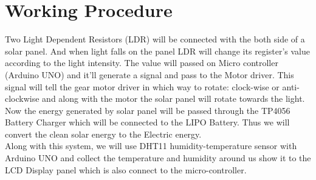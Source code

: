 \section*{Working Procedure}
Two Light Dependent Resistors (LDR) will be connected with the both side of a solar panel. And when light falls on the panel LDR will change its register's value according to the light intensity. The value will passed on Micro controller (Arduino UNO) and it'll generate a signal and pass to the Motor driver. This signal will tell the gear motor driver in which way to rotate: clock-wise or anti-clockwise and along with the motor the solar panel will rotate towards the light.\\

Now the energy generated by solar panel will be passed through the TP4056 Battery Charger which will be connected to the LIPO Battery. Thus we will convert the clean solar energy to the Electric energy.\\
Along with this system, we will use DHT11 humidity-temperature sensor with Arduino UNO and collect the temperature and humidity around us show it to the LCD Display panel which is also connect to the micro-controller.

